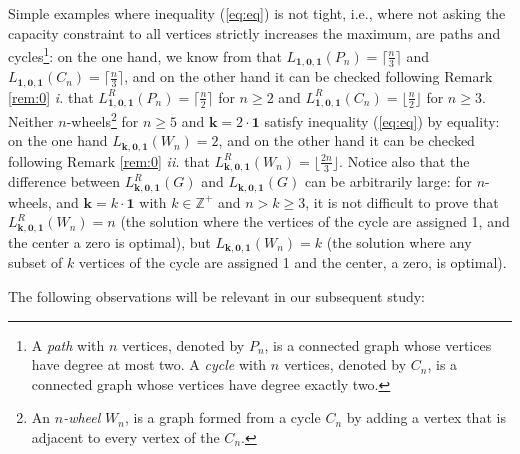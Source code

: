 \documentclass[preprint,12pt]{article}
\renewcommand{\geq}{\geqslant}
\theoremstyle{definition}
\begin{document}
Simple examples where  inequality (\ref{eq:eq}) is not tight, i.e., where not asking the capacity constraint to all vertices  strictly  increases the maximum, are paths and cycles\footnote{A \emph{path} with $n$ vertices, denoted by $P_n$, is a connected graph whose vertices have degree at most two. A \emph{cycle} with $n$ vertices, denoted by $C_n$, is a connected graph whose vertices have degree exactly two.}:
on the one  hand, we know from \cite{DHL2017} that 
$L_{ \mathbf{1}, \mathbf{0}, \mathbf{1}}(P_{n})=\lceil\frac{n}{3}\rceil$
and  $L_{ \mathbf{1}, \mathbf{0}, \mathbf{1}}(C_{n})=\lceil\frac{n}{3}\rceil$, 
and on the other hand it can be checked following Remark  \ref{rem:0} \textit{i.} that
$L^R_{ \mathbf{1}, \mathbf{0}, \mathbf{1}}(P_n)=\lceil\frac{n}{2}\rceil$ for  $n \geq 2$ and  $L^R_{ \mathbf{1}, \mathbf{0}, \mathbf{1}}(C_n)=\lfloor\frac{n}{2}\rfloor$  for  $n \geq 3$.
Neither $n$-wheels\footnote{An \emph{ $n$-wheel} $W_n$, is a graph formed from a cycle $C_{n}$ by adding a vertex that is adjacent to every vertex of the $C_{n}$.} for $n\geq 5$ and $\mathbf{k}=2 \cdot \mathbf{1}$ satisfy inequality (\ref{eq:eq}) by equality: on the one hand $L_{\mathbf{k},  \mathbf{0}, \mathbf{1}}(W_n)=2$, and on the other hand it can be checked following Remark \ref{rem:0} \textit{ii.}  that
$L^R_{\mathbf{k}, \mathbf{0}, \mathbf{1}}(W_n)=\lfloor\frac{2n}{3}\rfloor$.
Notice also that the difference between  $L^R_{\mathbf{k}, \mathbf{0}, \mathbf{1}}(G)$  and $L_{\mathbf{\mathbf{k}, \mathbf{0},1}}(G)$ can be arbitrarily large: for $n$-wheels,  and  $\mathbf{k}=k\cdot \mathbf{1}$ with $k\in \mathbb{Z}^+$ and $n > k\geq 3$, it is not difficult to prove that $L^R_{\mathbf{k}, \mathbf{0}, \mathbf{1}}(W_n)=n$ (the solution  where the vertices of the cycle are assigned 1, and the center  a zero is optimal), but  $L_{\mathbf{k},\mathbf{0}, \mathbf{1}}(W_n)=k$ (the solution  where any subset of $k$ vertices of the cycle are assigned 1 and the center, a zero, is optimal). 


The following observations will be relevant in our subsequent study:
\end{document}
